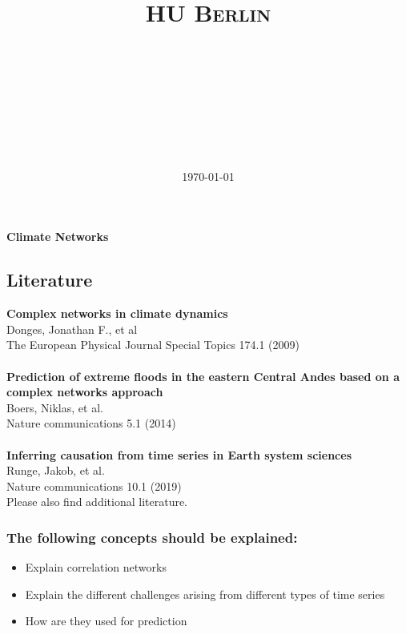 \documentclass[a4paper,12pt]{article}
\title{
\vspace{2in}
\huge{\textsc{HU Berlin}\\\vspace{0.3cm}\hmwkClass}\\
\horrule{0.5pt} \\[0.4cm] %
\huge{\textmd{\textbf{\ \hmwkTitle}}}\\
\horrule{2pt} \\[0.5cm] %
\vspace{3in}
}
\author{\Large{\textbf{\hmwkAuthorName}}}
\date{\today} %
\newcommand{\hmwkTitle}{Climate Networks} %
\newcommand{\hmwkDueDate}{} %
\begin{document}



\vspace*{1mm}
\begin{center}
    {\LARGE\textbf{\hmwkTitle}}\\
   \hmwkDueDate
\end{center}

\subsection*{Literature}
\textbf{Complex networks in climate dynamics}\\
Donges, Jonathan F., et al\\
The European Physical Journal Special Topics 174.1 (2009)\\
\\
\textbf{Prediction of extreme floods in the eastern Central Andes based on a complex networks approach}\\
Boers, Niklas, et al.\\
Nature communications 5.1 (2014)\\
\\
\textbf{Inferring causation from time series in Earth system sciences}\\
Runge, Jakob, et al.\\
Nature communications 10.1 (2019)\\

Please also find additional literature.

\subsubsection*{The following concepts should be explained:}
\small{
\begin{itemize}
\item Explain correlation networks
\item Explain the different challenges arising from different types of time series
\item How are they used for prediction
\end{itemize}}
\end{document}
